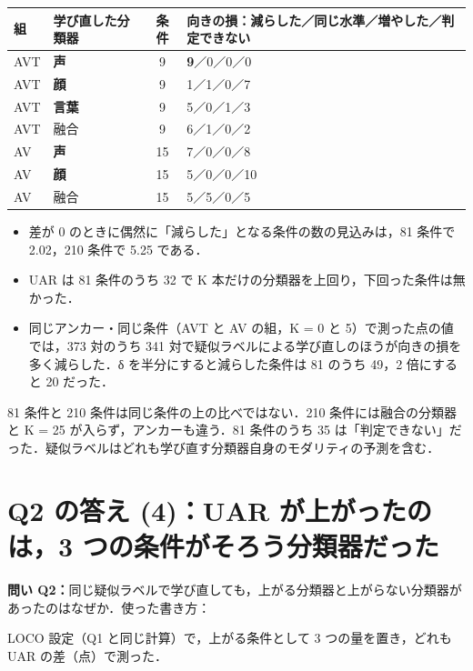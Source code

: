 \documentclass[a4paper,10pt]{ltjsarticle}
\newcommand{\toihead}[4][]{\begin{headbar}[#2]\textbf{\textcolor{#2}{問い #3：}}#4\if\relax\detokenize{#1}\relax\else\hfill{\small 使った書き方：}#1\fi\end{headbar}}
\newcommand{\pagesection}[1]{\clearpage\section{#1}}
\begin{document}
\begin{center}
\small
\begin{tabular}{llcl}
\toprule
組 & 学び直した分類器 & 条件 & 向きの損：減らした／同じ水準／増やした／判定できない \\
\midrule
AVT & \textcolor{cA}{\textbf{声}} & 9 & \textbf{9}／0／0／0 \\
AVT & \textcolor{cV}{\textbf{顔}} & 9 & 1／1／0／7 \\
AVT & \textcolor{cT}{\textbf{言葉}} & 9 & 5／0／1／3 \\
AVT & 融合 & 9 & 6／1／0／2 \\
AV & \textcolor{cA}{\textbf{声}} & 15 & 7／0／0／8 \\
AV & \textcolor{cV}{\textbf{顔}} & 15 & 5／0／0／10 \\
AV & 融合 & 15 & 5／5／0／5 \\
\bottomrule
\end{tabular}
\end{center}
\begin{itemize}
  \item 差が 0 のときに偶然に「減らした」となる条件の数の見込みは，81 条件で 2.02，210 条件で 5.25 である．
  \item UAR は 81 条件のうち 32 で K 本だけの分類器を上回り，下回った条件は無かった．
  \item 同じアンカー・同じ条件（AVT と AV の組，K = 0 と 5）で測った点の値では，373 対のうち 341 対で疑似ラベルによる学び直しのほうが向きの損を多く減らした．δ を半分にすると減らした条件は 81 のうち 49，2 倍にすると 20 だった．
\end{itemize}
\begin{yowai}
81 条件と 210 条件は同じ条件の上の比べではない．210 条件には融合の分類器と K = 25 が入らず，アンカーも違う．81 条件のうち 35 は「判定できない」だった．疑似ラベルはどれも学び直す分類器自身のモダリティの予測を含む．
\end{yowai}

\pagesection{Q2 の答え (4)：UAR が上がったのは，3 つの条件がそろう分類器だった}\label{sec:q2cond}
\toihead{cQ2}{Q2}{同じ疑似ラベルで学び直しても，上がる分類器と上がらない分類器があったのはなぜか．}

\noindent LOCO 設定（Q1 と同じ計算）で，上がる条件として 3 つの量を置き，どれも UAR の差（点）で測った．
\end{document}
